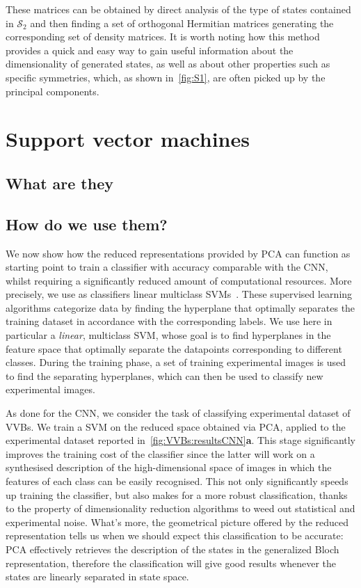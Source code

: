 These matrices can be obtained by direct analysis of the type of states contained in $\mathcal S_2$ and then finding a set of orthogonal Hermitian matrices generating the corresponding set of density matrices.
It is worth noting how this method provides a quick and easy way to gain useful information about the dimensionality of generated states, as well as about other properties such as specific symmetries, which, as shown in~\cref{fig:S1}, are often picked up by the principal components.


\section{Support vector machines}
\label{sec:VVBs:SVMs}

\subsection{What are they}


\subsection{How do we use them?}

We now show how the reduced representations provided by \ac{PCA} can function as starting point to train a classifier with accuracy comparable with the \ac{CNN}, whilst requiring a significantly reduced amount of computational resources.
More precisely, we use as classifiers linear multiclass \acp{SVM}~\cite{hearst1998support,shawe2000support}. These supervised learning algorithms categorize data by finding the hyperplane that optimally separates the training dataset in accordance with the corresponding labels.
We use here in particular a \emph{linear}, multiclass \ac{SVM}, whose goal is to find hyperplanes in the feature space that optimally separate the datapoints corresponding to different classes.
During the training phase, a set of training experimental images is used to find the separating hyperplanes, which can then be used to classify new experimental images.

As done for the \ac{CNN}, we consider the task of classifying experimental dataset of VVBs. We train a \ac{SVM} on the reduced space obtained via \ac{PCA}, applied to the experimental dataset reported in~\cref{fig:VVBs:resultsCNN}\textbf{a}. This stage significantly improves the training cost of the classifier since the latter will work on a synthesised description of the high-dimensional space of images in which the features of each class can be easily recognised.
This not only significantly speeds up training the classifier, but also makes for a more robust classification, thanks to the property of dimensionality reduction algorithms to weed out statistical and experimental noise.
What's more, the geometrical picture offered by the reduced representation tells us when we should expect this classification to be accurate: \ac{PCA} effectively retrieves the description of the states in the generalized Bloch representation, therefore the classification will give good results whenever the states are linearly separated in state space.


